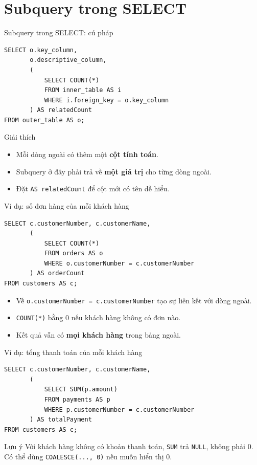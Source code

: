 \documentclass[aspectratio=169,10pt]{beamer}
\newcommand{\code}[1]{\texttt{#1}}
\begin{document}
\section{Subquery trong SELECT}

\begin{frame}[fragile]{Subquery trong SELECT: cú pháp}
\begin{lstlisting}
SELECT o.key_column,
       o.descriptive_column,
       (
           SELECT COUNT(*)
           FROM inner_table AS i
           WHERE i.foreign_key = o.key_column
       ) AS relatedCount
FROM outer_table AS o;
\end{lstlisting}
\begin{block}{Giải thích}
\begin{itemize}
\item Mỗi dòng ngoài có thêm một \textbf{cột tính toán}.
\item Subquery ở đây phải trả về \textbf{một giá trị} cho từng dòng ngoài.
\item Đặt \code{AS relatedCount} để cột mới có tên dễ hiểu.
\end{itemize}
\end{block}
\end{frame}

\begin{frame}[fragile]{Ví dụ: số đơn hàng của mỗi khách hàng}
\begin{lstlisting}
SELECT c.customerNumber, c.customerName,
       (
           SELECT COUNT(*)
           FROM orders AS o
           WHERE o.customerNumber = c.customerNumber
       ) AS orderCount
FROM customers AS c;
\end{lstlisting}
\begin{itemize}
\item Vế \code{o.customerNumber = c.customerNumber} tạo sự liên kết với dòng ngoài.
\item \code{COUNT(*)} bằng 0 nếu khách hàng không có đơn nào.
\item Kết quả vẫn có \textbf{mọi khách hàng} trong bảng ngoài.
\end{itemize}
\end{frame}

\begin{frame}[fragile]{Ví dụ: tổng thanh toán của mỗi khách hàng}
\begin{lstlisting}
SELECT c.customerNumber, c.customerName,
       (
           SELECT SUM(p.amount)
           FROM payments AS p
           WHERE p.customerNumber = c.customerNumber
       ) AS totalPayment
FROM customers AS c;
\end{lstlisting}
\begin{alertblock}{Lưu ý}
\small Với khách hàng không có khoản thanh toán, \code{SUM} trả \code{NULL}, không phải 0. Có thể dùng \code{COALESCE(..., 0)} nếu muốn hiển thị 0.
\end{alertblock}
\end{frame}
\end{document}
